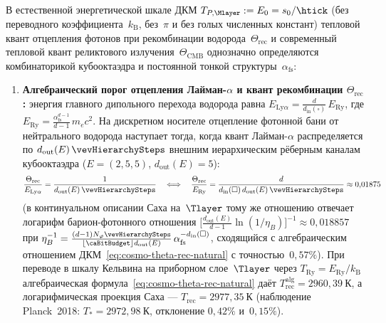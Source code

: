 \begin{theorem}
\label{thm:cosmo-cmb-natural-scale}
В естественной энергетической шкале ДКМ $T_{P,\Mlayer} := E_0 = s_0/\htick$ (без переводного коэффициента~$k_{\mathrm{B}}$, без~$\pi$ и без голых численных констант) тепловой квант отцепления фотонов при рекомбинации водорода~$\Theta_{\mathrm{rec}}$ и современный тепловой квант реликтового излучения~$\Theta_{\mathrm{CMB}}$ однозначно определяются комбинаторикой кубооктаэдра и постоянной тонкой структуры~$\alpha_{\mathrm{fs}}$:
\begin{enumerate}[leftmargin=*]
\item \textbf{Алгебраический порог отцепления Лайман-$\alpha$ и квант рекомбинации $\Theta_{\mathrm{rec}}$:}
  энергия главного дипольного перехода водорода равна $E_{\mathrm{Ly}\alpha} = \frac{d}{d_{\mathrm{in}}(\square)}\,E_{\mathrm{Ry}}$, где $E_{\mathrm{Ry}} = \frac{\alpha_{\mathrm{fs}}^{d-1}}{d-1}\,m_e c^2$.
  На дискретном носителе отцепление фотонной бани от нейтрального водорода наступает тогда, когда квант Лайман-$\alpha$ распределяется по $d_{\mathrm{out}}(E)\,\vevHierarchySteps$ внешним иерархическим рёберным каналам кубооктаэдра ($E=(2,5,5)$, $d_{\mathrm{out}}(E)=5$):
  \begin{equation}
  \label{eq:cosmo-theta-rec-natural}
    \frac{\Theta_{\mathrm{rec}}}{E_{\mathrm{Ly}\alpha}}
    = \frac{1}{d_{\mathrm{out}}(E)\,\vevHierarchySteps}
    \quad\Longleftrightarrow\quad
    \frac{\Theta_{\mathrm{rec}}}{E_{\mathrm{Ry}}}
    = \frac{d}{d_{\mathrm{in}}(\square)\,d_{\mathrm{out}}(E)\,\vevHierarchySteps}
    \approx 0{,}01875
  \end{equation}
  (в континуальном описании Саха на~$\Tlayer$ тому же отношению отвечает логарифм барион-фотонного отношения $\bigl[\frac{d_{\mathrm{out}}(E)}{d-1}\ln(1/\eta_B)\bigr]^{-1} \approx 0{,}018857$ при $\eta_B^{-1} = \frac{(d-1)N_\varphi\vevHierarchySteps}{\lfloor\caBitBudget\rfloor d_{\mathrm{out}}(E)}\,\alpha_{\mathrm{fs}}^{-d_{\mathrm{in}}(\square)}$, сходящийся с алгебраическим отношением ДКМ~\eqref{eq:cosmo-theta-rec-natural} с точностью~$0{,}57\%$).
  При переводе в шкалу Кельвина на приборном слое~$\Tlayer$ через $T_{\mathrm{Ry}} = E_{\mathrm{Ry}}/k_{\mathrm{B}}$ алгебраическая формула~\eqref{eq:cosmo-theta-rec-natural} даёт $T_{\mathrm{rec}}^{\mathrm{alg}} = 2960{,}39\ \mathrm{К}$, а логарифмическая проекция Саха — $T_{\mathrm{rec}} = 2977{,}35\ \mathrm{К}$ (наблюдение Planck~2018: $T_* = 2972{,}98\ \mathrm{К}$, отклонение $0{,}42\%$ и~$0{,}15\%$).

\end{enumerate}
\end{theorem}
